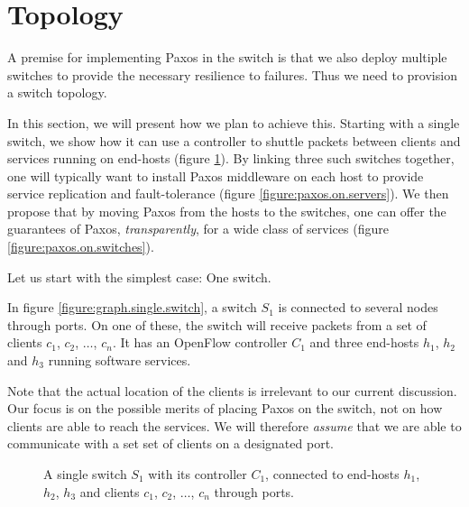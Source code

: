 \section{Topology}

A premise for implementing Paxos in the switch is that we also deploy
multiple switches to provide the necessary resilience to failures.
%
Thus we need to provision a switch topology.

In this section, we will present how we plan to achieve this.
%
Starting with a single switch, we show how it can use a controller to
shuttle packets between clients and services running on end-hosts (figure
\ref{figure:graph.single.switch}).
%
By linking three such switches together, one will typically want to install
Paxos middleware on each host to provide service replication and
fault-tolerance (figure \ref{figure:paxos.on.servers}).
%
We then propose that by moving Paxos from the hosts to the switches, one can
offer the guarantees of Paxos, \textit{transparently}, for a wide class of
services (figure \ref{figure:paxos.on.switches}).

Let us start with the simplest case: One switch.

In figure \vref{figure:graph.single.switch}, a switch $S_1$ is connected to
several nodes through ports.  On one of these, the switch will receive
packets from a set of clients $c_1$, $c_2$, $\dots$, $c_n$.
%
It has an OpenFlow controller $C_1$ and three end-hosts $h_1$, $h_2$ and
$h_3$ running software services.

Note that the actual location of the clients is irrelevant to our current
discussion.  Our focus is on the possible merits of placing Paxos on the
switch, not on how clients are able to reach the services. We will therefore
\textit{assume} that we are able to communicate with a set set of clients on
a designated port.

\begin{figure}[H]
  \centering
  \caption{A single switch $S_1$ with its controller $C_1$, connected
    to end-hosts $h_1$, $h_2$, $h_3$ and clients $c_1$, $c_2$, $\dots$, $c_n$
    through ports.}
  \label{figure:graph.single.switch}
\end{figure}

